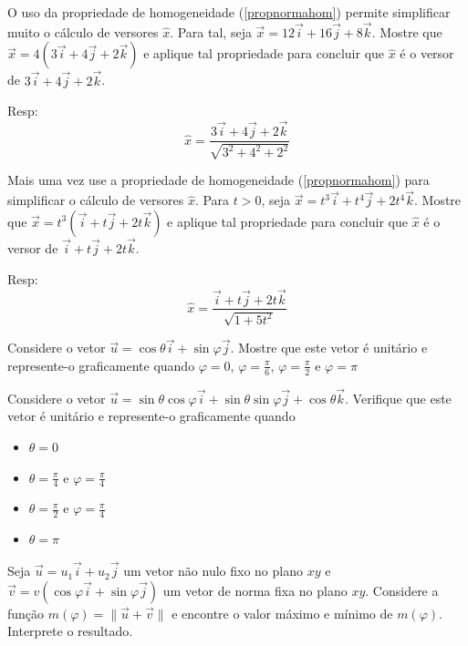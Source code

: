 \begin{exer}
O uso da propriedade de homogeneidade (\ref{propnormahom}) permite simplificar muito o cálculo de versores $\hat{x}$. Para tal, seja $\vec{x} = 12 \vec{i} + 16 \vec{j} + 8 \vec{k}$. Mostre que $\vec{x} = 4 ( 3 \vec{i} + 4 \vec{j} + 2 \vec{k} ) $ e aplique tal propriedade para concluir que $\hat{x}$ é o versor de $3 \vec{i} + 4 \vec{j} + 2 \vec{k}$.
\end{exer}
Resp:
$$\hat{x} = \frac{ 3 \vec{i} + 4 \vec{j} + 2 \vec{k} }{\sqrt{3^2 + 4^2 + 2^2}}$$

\begin{exer}
Mais uma vez use a propriedade de homogeneidade (\ref{propnormahom}) para simplificar  o cálculo de versores $\hat{x}$. Para $t > 0$, seja $\vec{x} = t^3 \vec{i} + t^4 \vec{j} + 2t^4 \vec{k}$. Mostre que $\vec{x} = t^3 (  \vec{i} + t \vec{j} + 2t \vec{k} ) $ e aplique tal propriedade para concluir que $\hat{x}$ é o versor de $\vec{i} + t \vec{j} + 2t \vec{k}$.
\end{exer}
Resp:
$$\hat{x} = \frac{ \vec{i} + t \vec{j} + 2t \vec{k} }{\sqrt{1 + 5t^2}}$$


\begin{exer} Considere o vetor $\vec{u}=\cos\theta \vec{i}+ \sin\varphi \vec{j}$. Mostre que este vetor é unitário e represente-o graficamente quando $\varphi=0$, $\varphi=\frac{\pi}{6}$, $\varphi=\frac{\pi}{2}$ e $\varphi={\pi}$
\end{exer}

\begin{exer} Considere o vetor $\vec{u}=\sin\theta \cos\varphi \vec{i}+ \sin\theta \sin\varphi \vec{j} + \cos\theta \vec{k}$. Verifique que este vetor é unitário e represente-o graficamente quando
\begin{itemize}
\item[a)] $\theta=0$
\item[b)] $\theta=\frac{\pi}{4}$ e $\varphi=\frac{\pi}{4}$
\item[c)] $\theta=\frac{\pi}{2}$ e $\varphi=\frac{\pi}{4}$
\item[d)] $\theta=\pi$

\end{itemize}
\end{exer}

\begin{exer}\label{probmaxmin} Seja $\vec{u}=u_1\vec{i} + u_2\vec{j}$ um vetor não nulo fixo no plano $xy$ e $\vec{v}=v\left(\cos\varphi \vec{i}+\sin\varphi \vec{j}\right)$ um vetor de norma fixa no plano $xy$. Considere a função $m(\varphi)=\|\vec{u}+\vec{v}\|$ e encontre o valor máximo e mínimo de $m(\varphi)$. Interprete o resultado.
\end{exer}

